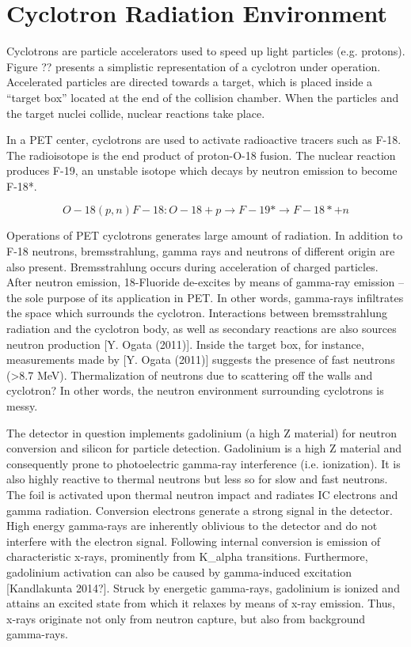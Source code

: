 \section{Cyclotron Radiation Environment}
Cyclotrons are particle accelerators used to speed up light particles (e.g. protons). Figure ?? presents a simplistic representation of a cyclotron under operation. Accelerated particles are directed towards a target, which is placed inside a “target box” located at the end of the collision chamber. When the particles and the target nuclei collide, nuclear reactions take place.


In a PET center, cyclotrons are used to activate radioactive tracers such as F-18. The radioisotope is the end product of proton-O-18 fusion. The nuclear reaction produces F-19, an unstable isotope which decays by neutron emission to become F-18*.

    \begin{equation}
    O-18(p,n)F-18: O-18 + p \rightarrow F-19* \rightarrow F-18*+n
    \end{equation}

Operations of PET cyclotrons generates large amount of radiation. In addition to F-18 neutrons, bremsstrahlung, gamma rays and neutrons of different origin are also present. Bremsstrahlung occurs during acceleration of charged particles. After neutron emission, 18-Fluoride de-excites by means of gamma-ray emission – the sole purpose of its application in PET. In other words, gamma-rays infiltrates the space which surrounds the cyclotron.
Interactions between bremsstrahlung radiation and the cyclotron body, as well as secondary reactions are also sources neutron production [Y. Ogata (2011)]. Inside the target box, for instance, measurements made by [Y. Ogata (2011)] suggests the presence of fast neutrons (>8.7 MeV). Thermalization of neutrons due to scattering off the walls and cyclotron? In other words, the neutron environment surrounding cyclotrons is messy.

The detector in question implements gadolinium (a high Z material) for neutron conversion and silicon for particle detection. Gadolinium is a high Z material and consequently prone to photoelectric gamma-ray interference (i.e. ionization). It is also highly reactive to thermal neutrons but less so for slow and fast neutrons.
The foil is activated upon thermal neutron impact and radiates IC electrons and gamma radiation. Conversion electrons generate a strong signal in the detector. High energy gamma-rays are inherently oblivious to the detector and do not interfere with the electron signal.
Following internal conversion is emission of characteristic x-rays, prominently from K_alpha transitions. Furthermore, gadolinium activation can also be caused by gamma-induced excitation [Kandlakunta 2014?]. Struck by energetic gamma-rays, gadolinium is ionized and attains an excited state from which it relaxes by means of x-ray emission. Thus, x-rays originate not only from neutron capture, but also from background gamma-rays.

